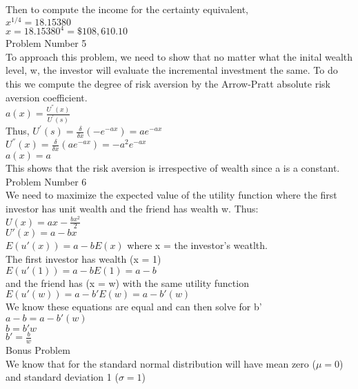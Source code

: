 \documentclass[11pt]{article}
\begin{document}
Then to compute the income for the certainty equivalent,\\
$x^{1/4} = 18.15380$\\
$x = 18.15380^{4} = \$ 108,610.10$\\

Problem Number 5\\
To approach this problem, we need to show that no matter what the inital wealth level, w, the investor will evaluate the incremental investment the same. To do this we compute the degree of risk aversion by the Arrow-Pratt absolute risk aversion coefficient.\\
$a(x) = \frac{U^{''}(x)}{U^{'}(s)}$\\

Thus,
$U^{'}(s) = \frac{\delta}{\delta x} (-e^{-ax}) = a e^{-ax}$\\
$U^{''}(x) = \frac{\delta}{\delta x} (a e^{-ax}) = -a^{2} e^{-ax}$\\
$a(x) = a$\\

This shows that the risk aversion is irrespective of wealth since a is a constant.\\

Problem Number 6\\
We need to maximize the expected value of the utility function where the first investor has unit wealth and the friend has wealth w. Thus:\\
$U(x) = ax - \frac{bx^{2}}{2}$\\
$U'(x) = a - bx$\\
$E(u'(x)) = a - bE(x)$ where x = the investor's weatlth.\\
The first investor has wealth (x = 1)\\
$E(u'(1)) = a - bE(1) = a - b$\\
and the friend has (x = w) with the same utility function\\
$E(u'(w)) = a - b'E(w) = a - b'(w)$\\
We know these equations are equal and can then solve for b'\\
$a - b = a - b'(w)$\\
$b = b'w$\\
$b' = \frac{b}{w}$\\

Bonus Problem\\
We know that for the standard normal distribution will have mean zero ($\mu = 0$) and standard deviation 1 ($\sigma = 1$)\\
\end{document}
